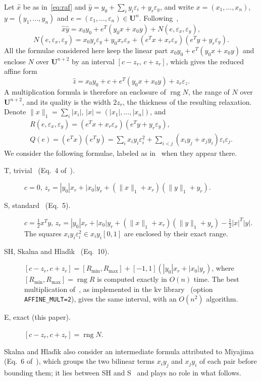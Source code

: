 \documentclass[10pt]{article}
\theoremstyle{definition}
\newcommand{\U}{\mathbf{U}}
\newcommand{\eps}{\varepsilon}
\newcommand{\ex}{\eps_x}
\newcommand{\ey}{\eps_y}
\newcommand{\rng}{\operatorname{rng}}
\begin{document}
Let $\hat x$ be as in~\eqref{eq:raf} and $\hat y = y_0+\sum_i y_i\eps_i + y_r\ey$, and write $x=(x_1,\dots,x_n)$, $y=(y_1,\dots,y_n)$ and $e=(\eps_1,\dots,\eps_n)\in\U^n$. Following~\cite{skalna2017new},
\begin{equation}
\label{eq:product}
\hat x\hat y = x_0y_0 + e^T(y_0x+x_0y) + N(e,\ex,\ey),
\end{equation}
\begin{equation}
\label{eq:N}
N(e,\ex,\ey) = x_0y_r\ey + y_0x_r\ex + (e^Tx + x_r\ex)(e^Ty + y_r\ey).
\end{equation}
All the formulae considered here keep the linear part $x_0y_0+e^T(y_0x+x_0y)$ and enclose $N$ over $\U^{n+2}$ by an interval $[c-z_r,\,c+z_r]$, which gives the reduced affine form
\begin{equation}
\label{eq:zhat}
\hat z = x_0y_0 + c + e^T(y_0x+x_0y) + z_r\eps_z .
\end{equation}
A multiplication formula is therefore an enclosure of $\rng N$, the range of $N$ over $\U^{n+2}$, and its quality is the width $2z_r$, the thickness of the resulting relaxation. Denote $\|x\|_1=\sum_i|x_i|$, $|x|=(|x_1|,\dots,|x_n|)$, and
\[
\begin{gathered}R(e,\ex,\ey) = (e^Tx + x_r\ex)(e^Ty + y_r\ey),\\ Q(e) = (e^Tx)(e^Ty) = \sum_i x_iy_i\eps_i^2 + \sum_{i<j}(x_iy_j+x_jy_i)\eps_i\eps_j .\end{gathered}
\]
We consider the following formulae, labeled as in~\cite{skalna2017new} when they appear there.
\begin{description}
\item[T, trivial~\cite{stolfi1997self} (Eq.~4 of~\cite{skalna2017new}).] $c=0$, $z_r = |y_0|x_r+|x_0|y_r+(\|x\|_1+x_r)(\|y\|_1+y_r)$.
\item[S, standard~\cite{kolev2004improved,vu2009enhancing} (Eq.~5).] $c=\tfrac12 x^Ty$, $z_r = |y_0|x_r+|x_0|y_r+(\|x\|_1+x_r)(\|y\|_1+y_r) - \tfrac12|x|^T|y|$. The squares $x_iy_i\eps_i^2\in x_iy_i[0,1]$ are enclosed by their exact range.
\item[SH, Skalna and Hlad\'{\i}k~\cite{skalna2017new} (Eq.~10).] $[c-z_r,c+z_r] = [R_{\min},R_{\max}] + [-1,1](|y_0|x_r+|x_0|y_r)$, where $[R_{\min},R_{\max}]=\rng R$ is computed exactly in $O(n)$ time. The best multiplication of~\cite{miyajima2003best}, as implemented in the kv library~\cite{kvlib} (option \texttt{AFFINE\_MULT=2}), gives the same interval, with an $O(n^2)$ algorithm.
\item[E, exact (this paper).] $[c-z_r,c+z_r]=\rng N$.
\end{description}
Skalna and Hlad\'{\i}k also consider an intermediate formula attributed to Miyajima (Eq.~6 of~\cite{skalna2017new}), which groups the two bilinear terms $x_iy_j$ and $x_jy_i$ of each pair before bounding them; it lies between SH and S~\cite[Prop.~3]{skalna2017new} and plays no role in what follows.
\end{document}
